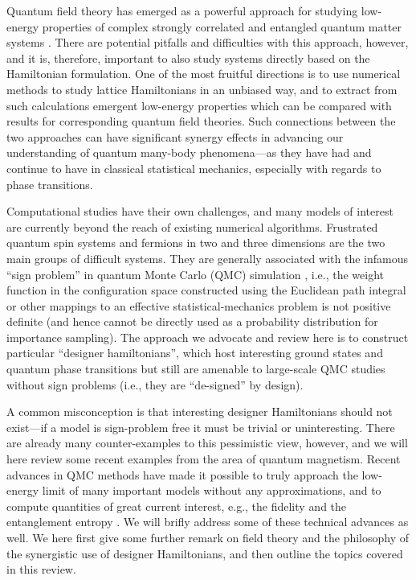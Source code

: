 \documentclass[range]{ar2e}
\begin{document}
Quantum field theory has emerged as a powerful approach for studying low-energy properties of
complex strongly correlated and entangled quantum matter systems \cite{Sachdev11}. There are potential pitfalls and difficulties 
with this approach, however, and it is, therefore, important to also study systems directly based on the Hamiltonian 
formulation. One of the most fruitful directions is to use numerical methods to study lattice Hamiltonians 
in an unbiased way, and to extract from such calculations emergent low-energy properties which can be 
compared with results for corresponding quantum field theories. Such connections between the two approaches 
can have significant synergy effects in advancing our understanding of quantum many-body phenomena---as they
have had and continue to have in classical statistical mechanics, especially with regards to phase transitions. 

Computational studies have their own challenges, and many models of interest are currently beyond the reach of existing 
numerical algorithms. Frustrated quantum spin systems and fermions in two and three dimensions are the two main groups 
of difficult systems. They are generally associated with the infamous ``sign problem'' in quantum Monte Carlo (QMC) simulation
\cite{Loh90,Henelius00,Nyfeler08}, i.e., the weight function in the configuration space constructed using the Euclidean path 
integral or other mappings to an effective statistical-mechanics problem is not positive definite (and hence cannot be directly 
used as a probability distribution for importance sampling). The approach we advocate and review here is to construct particular 
``designer hamiltonians'', which host interesting ground states and quantum phase transitions but still are amenable to 
large-scale QMC studies without sign problems (i.e., they are ``de-signed'' by design). 

A common misconception is that interesting designer Hamiltonians should not exist---if a model is sign-problem 
free it must be trivial or uninteresting. There are already many counter-examples to this pessimistic view, 
however, and we will here review some recent examples from the area of quantum magnetism. Recent advances in QMC 
methods \cite{Sandvik91,Evertz93,Beard96,Prokofev98,Sandvik99,Sandvik10a} have made it possible to truly approach the 
low-energy limit of many important models without any approximations, and to compute quantities of great current interest, 
e.g., the fidelity \cite{Schwandt09,Degrandi11} and the entanglement entropy \cite{Hastings10}. We will brifly address some 
of these technical advances as well. We here first give some further remark on field theory and the philosophy of the 
synergistic use of designer Hamiltonians, and then outline the topics covered in this review.
\end{document}

